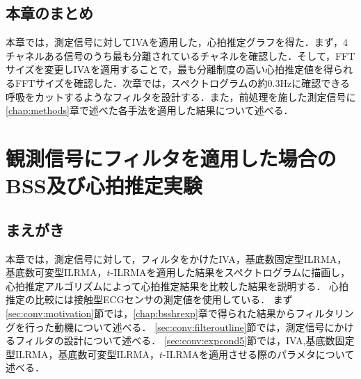 {%

\section{本章のまとめ}
本章では，測定信号に対してIVAを適用した，心拍推定グラフを得た．まず，4チャネルある信号のうち最も分離されているチャネルを確認した．そして，FFTサイズを変更しIVAを適用することで，最も分離制度の高い心拍推定値を得られるFFTサイズを確認した．次章では，スペクトログラムの約0.3Hzに確認できる呼吸をカットするようなフィルタを設計する．また，前処理を施した測定信号に\ref{chap:methods}章で述べた各手法を適用した結果について述べる．


\chapter{観測信号にフィルタを適用した場合のBSS及び心拍推定実験}
\label{chap:fbsshrexp}

\section{まえがき}
本章では，測定信号に対して，フィルタをかけたIVA，基底数固定型ILRMA，基底数可変型ILRMA，$t$-ILRMAを適用した結果をスペクトログラムに描画し，心拍推定アルゴリズムによって心拍推定結果を比較した結果を説明する．
心拍推定の比較には接触型ECGセンサの測定値を使用している．
まず\ref{sec:conv:motivation}節では，\ref{chap:bsshrexp}章で得られた結果からフィルタリングを行った動機について述べる．
\ref{sec:conv:filteroutline}節では，測定信号にかけるフィルタの設計について述べる．
\ref{sec:conv:expcond5}節では，IVA,基底数固定型ILRMA，基底数可変型ILRMA，$t$-ILRMAを適用させる際のパラメタについて述べる．

}
